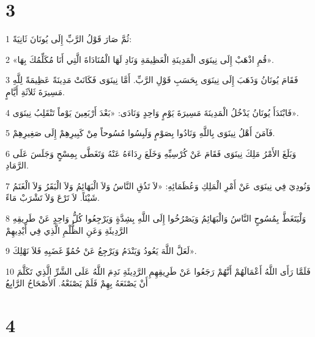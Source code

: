 \chapter{3}

\par 1 ثُمَّ صَارَ قَوْلُ الرَّبِّ إِلَى يُونَانَ ثَانِيَةً:
\par 2 «قُمِ اذْهَبْ إِلَى نِينَوَى الْمَدِينَةِ الْعَظِيمَةِ وَنَادِ لَهَا الْمُنَادَاةَ الَّتِي أَنَا مُكَلِّمُكَ بِهَا».
\par 3 فَقَامَ يُونَانُ وَذَهَبَ إِلَى نِينَوَى بِحَسَبِ قَوْلِ الرَّبِّ. أَمَّا نِينَوَى فَكَانَتْ مَدِينَةً عَظِيمَةً لِلَّهِ مَسِيرَةَ ثَلاَثَةِ أَيَّامٍ.
\par 4 فَابْتَدَأَ يُونَانُ يَدْخُلُ الْمَدِينَةَ مَسِيرَةَ يَوْمٍ وَاحِدٍ وَنَادَى: «بَعْدَ أَرْبَعِينَ يَوْماً تَنْقَلِبُ نِينَوَى».
\par 5 فَآمَنَ أَهْلُ نِينَوَى بِاللَّهِ وَنَادُوا بِصَوْمٍ وَلَبِسُوا مُسُوحاً مِنْ كَبِيرِهِمْ إِلَى صَغِيرِهِمْ.
\par 6 وَبَلَغَ الأَمْرُ مَلِكَ نِينَوَى فَقَامَ عَنْ كُرْسِيِّهِ وَخَلَعَ رِدَاءَهُ عَنْهُ وَتَغَطَّى بِمِسْحٍ وَجَلَسَ عَلَى الرَّمَادِ.
\par 7 وَنُودِيَ فِي نِينَوَى عَنْ أَمْرِ الْمَلِكِ وَعُظَمَائِهِ: «لاَ تَذُقِ النَّاسُ وَلاَ الْبَهَائِمُ وَلاَ الْبَقَرُ وَلاَ الْغَنَمُ شَيْئاً. لاَ تَرْعَ وَلاَ تَشْرَبْ مَاءً.
\par 8 وَلْيَتَغَطَّ بِمُسُوحٍ النَّاسُ وَالْبَهَائِمُ وَيَصْرُخُوا إِلَى اللَّهِ بِشِدَّةٍ وَيَرْجِعُوا كُلُّ وَاحِدٍ عَنْ طَرِيقِهِ الرَّدِيئَةِ وَعَنِ الظُّلْمِ الَّذِي فِي أَيْدِيهِمْ
\par 9 لَعَلَّ اللَّهَ يَعُودُ وَيَنْدَمُ وَيَرْجِعُ عَنْ حُمُوِّ غَضَبِهِ فَلاَ نَهْلِكَ».
\par 10 فَلَمَّا رَأَى اللَّهُ أَعْمَالَهُمْ أَنَّهُمْ رَجَعُوا عَنْ طَرِيقِهِمِ الرَّدِيئَةِ نَدِمَ اللَّهُ عَلَى الشَّرِّ الَّذِي تَكَلَّمَ أَنْ يَصْنَعَهُ بِهِمْ فَلَمْ يَصْنَعْهُ. اَلأَصْحَاحُ الرَّابِعُ

\chapter{4}

